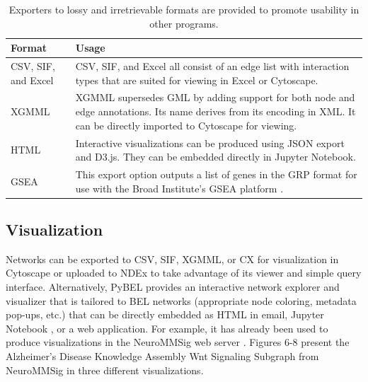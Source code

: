 \begin{table}
\centering
\caption[PyBEL Export Formats]{Exporters to lossy and irretrievable formats are provided to promote usability in other programs.}
\label{tab:lossy_exporters}
\def\arraystretch{1.5}
\begin{tabular}{p{2cm} p{12cm}}
Format              & Usage \\
\hline
CSV, SIF, and Excel & \ac{CSV}, \ac{SIF}, and Excel all consist of an edge list with interaction types that are suited for viewing in Excel or Cytoscape.                                                                                              \\
XGMML               & \ac{XGMML} \cite{xgmml} supersedes \ac{GML} by adding support for both node and edge annotations. Its name derives from its encoding in \ac{XML}. It can be directly imported to Cytoscape for viewing. \\
HTML                & Interactive visualizations can be produced using JSON export and D3.js. They can be embedded directly in Jupyter Notebook.                                                                                                                                                  \\
GSEA                & This export option outputs a list of genes in the \ac{GRP} format for use with the Broad Institute’s \ac{GSEA} platform \cite{Subramanian2005}.
\end{tabular}
\end{table}


\subsection{Visualization}

Networks can be exported to \ac{CSV}, \ac{SIF}, \ac{XGMML}, or CX for visualization in Cytoscape \cite{Franz2015} or uploaded to \ac{NDEx} \cite{Pratt2015} to take advantage of its viewer and simple query interface. Alternatively, PyBEL provides an interactive network explorer and visualizer that is tailored to \ac{BEL} networks (appropriate node coloring, metadata pop-ups, etc.) that can be directly embedded as \ac{HTML} in email, Jupyter Notebook \cite{Kluyver2016}, or a web application. For example, it has already been used to produce visualizations in the NeuroMMSig web server \cite{Domingo-Fernandez2017}. Figures 6-8 present the Alzheimer’s Disease Knowledge Assembly Wnt Signaling Subgraph from \ac{NeuroMMSig} in three different visualizations.

